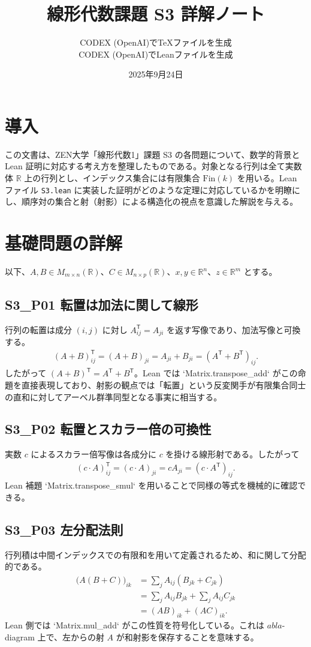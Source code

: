 \documentclass[12pt]{ltjsarticle}
\title{線形代数課題 S3 詳解ノート}
\author{CODEX (OpenAI)でTeXファイルを生成\\CODEX (OpenAI)でLeanファイルを生成}
\date{2025年9月24日}
\begin{document}
\maketitle

\section{導入}
この文書は、ZEN大学「線形代数1」課題 S3 の各問題について、数学的背景と Lean 証明に対応する考え方を整理したものである。対象となる行列は全て実数体 $\mathbb{R}$ 上の行列とし、インデックス集合には有限集合 $\mathrm{Fin}(k)$ を用いる。Lean ファイル \texttt{S3.lean} に実装した証明がどのような定理に対応しているかを明瞭にし、順序対の集合と射（射影）による構造化の視点を意識した解説を与える。

\section{基礎問題の詳解}
以下、$A,B\in M_{m\times n}(\mathbb{R})$、$C\in M_{n\times p}(\mathbb{R})$、$x,y\in \mathbb{R}^n$、$z\in \mathbb{R}^m$ とする。

\subsection{S3\_P01 転置は加法に関して線形}
行列の転置は成分 $(i,j)$ に対し $A^{\mathsf{T}}_{ij}=A_{ji}$ を返す写像であり、加法写像と可換する。
\begin{align*}
  (A+B)^{\mathsf{T}}_{ij}
  = (A+B)_{ji}
  = A_{ji}+B_{ji}
  = (A^{\mathsf{T}}+B^{\mathsf{T}})_{ij}.
\end{align*}
したがって $(A+B)^{\mathsf{T}}=A^{\mathsf{T}}+B^{\mathsf{T}}$。Lean では `Matrix.transpose_add` がこの命題を直接表現しており、射影の観点では「転置」という反変関手が有限集合同士の直和に対してアーベル群準同型となる事実に相当する。

\subsection{S3\_P02 転置とスカラー倍の可換性}
実数 $c$ によるスカラー倍写像は各成分に $c$ を掛ける線形射である。したがって
\begin{align*}
  (c\cdot A)^{\mathsf{T}}_{ij} = (c\cdot A)_{ji} = c A_{ji} = (c\cdot A^{\mathsf{T}})_{ij}.
\end{align*}
Lean 補題 `Matrix.transpose_smul` を用いることで同様の等式を機械的に確認できる。

\subsection{S3\_P03 左分配法則}
行列積は中間インデックスでの有限和を用いて定義されるため、和に関して分配的である。
\begin{align*}
  \bigl(A(B+C)\bigr)_{ik}
  &= \sum_{j} A_{ij}(B_{jk}+C_{jk}) \\
  &= \sum_{j} A_{ij}B_{jk} + \sum_{j} A_{ij}C_{jk} \\
  &= (AB)_{ik} + (AC)_{ik}.
\end{align*}
Lean 側では `Matrix.mul_add` がこの性質を符号化している。これは $
abla$-diagram 上で、左からの射 $A$ が和射影を保存することを意味する。
\end{document}
